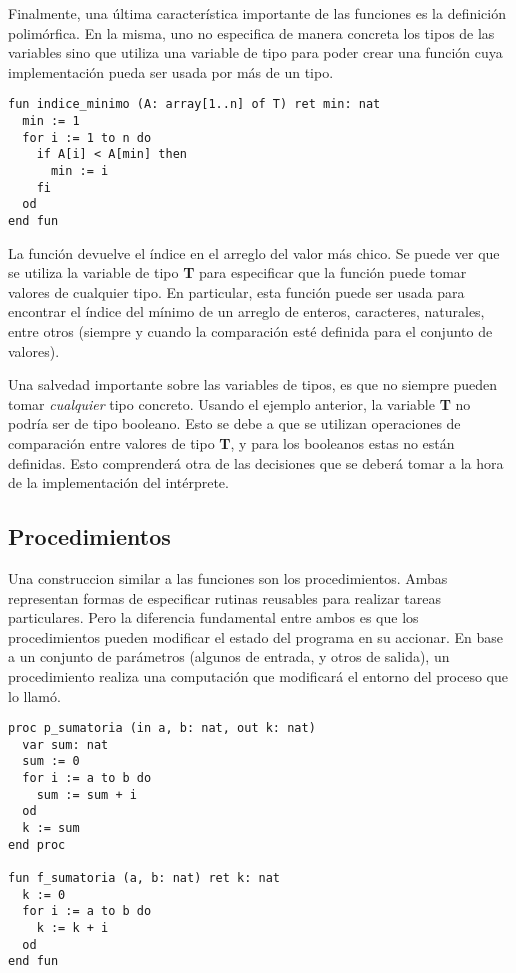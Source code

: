 \documentclass{article}
\begin{document}
Finalmente, una última característica importante de las funciones es la definición polimórfica.
En la misma, uno no especifica de manera concreta los tipos de las variables sino que utiliza una variable de tipo para poder crear una función cuya implementación pueda ser usada por más de un tipo.

\begin{lstlisting}
fun indice_minimo (A: array[1..n] of T) ret min: nat
  min := 1
  for i := 1 to n do
    if A[i] < A[min] then
      min := i
    fi
  od
end fun
\end{lstlisting}

La función devuelve el índice en el arreglo del valor más chico.
Se puede ver que se utiliza la variable de tipo \textbf{T} para especificar que la función puede tomar valores de cualquier tipo.
En particular, esta función puede ser usada para encontrar el índice del mínimo de un arreglo de enteros, caracteres, naturales, entre otros (siempre y cuando la comparación esté definida para el conjunto de valores).

Una salvedad importante sobre las variables de tipos, es que no siempre pueden tomar \textit{cualquier} tipo concreto.
Usando el ejemplo anterior, la variable \textbf{T} no podría ser de tipo booleano.
Esto se debe a que se utilizan operaciones de comparación entre valores de tipo \textbf{T}, y para los booleanos estas no están definidas.
Esto comprenderá otra de las decisiones que se deberá tomar a la hora de la implementación del intérprete.

\subsection{Procedimientos}

Una construccion similar a las funciones son los procedimientos.
Ambas representan formas de especificar rutinas reusables para realizar tareas particulares.
Pero la diferencia fundamental entre ambos es que los procedimientos pueden modificar el estado del programa en su accionar.
En base a un conjunto de parámetros (algunos de entrada, y otros de salida), un procedimiento realiza una computación que modificará el entorno del proceso que lo llamó.

\begin{lstlisting}
proc p_sumatoria (in a, b: nat, out k: nat)
  var sum: nat
  sum := 0
  for i := a to b do
    sum := sum + i
  od
  k := sum
end proc

fun f_sumatoria (a, b: nat) ret k: nat
  k := 0
  for i := a to b do
    k := k + i
  od
end fun
\end{lstlisting}
\end{document}
